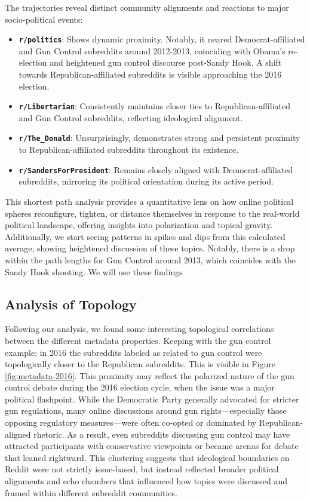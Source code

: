 \documentclass{article}
\begin{document}
The trajectories reveal distinct community alignments and reactions to major socio-political events:
\begin{itemize}
    \item \textbf{\texttt{r/politics}}: Shows dynamic proximity. Notably, it neared Democrat-affiliated and Gun Control subreddits around 2012-2013, coinciding with Obama's re-election and heightened gun control discourse post-Sandy Hook. A shift towards Republican-affiliated subreddits is visible approaching the 2016 election.
    \item \textbf{\texttt{r/Libertarian}}: Consistently maintains closer ties to Republican-affiliated and Gun Control subreddits, reflecting ideological alignment.
    \item \textbf{\texttt{r/The\_Donald}}: Unsurprisingly, demonstrates strong and persistent proximity to Republican-affiliated subreddits throughout its existence.
    \item \textbf{\texttt{r/SandersForPresident}}: Remains closely aligned with Democrat-affiliated subreddits, mirroring its political orientation during its active period.
\end{itemize}
This shortest path analysis provides a quantitative lens on how online political spheres reconfigure, tighten, or distance themselves in response to the real-world political landscape, offering insights into polarization and topical gravity. Additionally, we start seeing patterns in spikes and dips from this calculated average, showing heightened discussion of these topics. Notably, there is a drop within the path lengths for Gun Control around 2013, which coincides with the Sandy Hook shooting. We will use these findings 

\subsection{Analysis of Topology}

Following our analysis, we found some interesting topological correlations between the different metadata properties. Keeping with the gun control example; in 2016 the subreddits labeled as related to gun control were topologically closer to the Republican subreddits. This is visible in Figure \ref{fig:metadata-2016}. This proximity may reflect the polarized nature of the gun control debate during the 2016 election cycle, when the issue was a major political flashpoint. While the Democratic Party generally advocated for stricter gun regulations, many online discussions around gun rights—especially those opposing regulatory measures—were often co-opted or dominated by Republican-aligned rhetoric. As a result, even subreddits discussing gun control may have attracted participants with conservative viewpoints or became arenas for debate that leaned rightward. This clustering suggests that ideological boundaries on Reddit were not strictly issue-based, but instead reflected broader political alignments and echo chambers that influenced how topics were discussed and framed within different subreddit communities.
\end{document}
